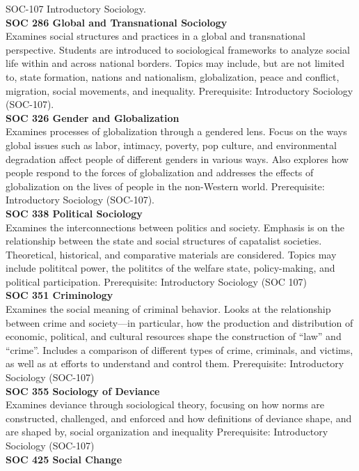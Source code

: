 \documentclass[
  letterpaper,
]{scrbook}
\begin{document}
SOC-107 Introductory Sociology.\\
\textbf{SOC 286 Global and Transnational Sociology}\\
Examines social structures and practices in a global and transnational
perspective. Students are introduced to sociological frameworks to
analyze social life within and across national borders. Topics may
include, but are not limited to, state formation, nations and
nationalism, globalization, peace and conflict, migration, social
movements, and inequality. Prerequisite: Introductory Sociology
(SOC-107).\\
\textbf{SOC 326 Gender and Globalization}\\
Examines processes of globalization through a gendered lens. Focus on
the ways global issues such as labor, intimacy, poverty, pop culture,
and environmental degradation affect people of different genders in
various ways. Also explores how people respond to the forces of
globalization and addresses the effects of globalization on the lives of
people in the non-Western world. Prerequisite: Introductory Sociology
(SOC-107).\\
\textbf{SOC 338 Political Sociology}\\
Examines the interconnections between politics and society. Emphasis is
on the relationship between the state and social structures of
capatalist societies. Theoretical, historical, and comparative materials
are considered. Topics may include polititcal power, the polititcs of
the welfare state, policy-making, and political participation.
Prerequisite: Introductory Sociology (SOC 107)\\
\textbf{SOC 351 Criminology}\\
Examines the social meaning of criminal behavior. Looks at the
relationship between crime and society---in particular, how the
production and distribution of economic, political, and cultural
resources shape the construction of ``law'' and ``crime''. Includes a
comparison of different types of crime, criminals, and victims, as well
as at efforts to understand and control them. Prerequisite: Introductory
Sociology (SOC-107)\\
\textbf{SOC 355 Sociology of Deviance}\\
Examines deviance through sociological theory, focusing on how norms are
constructed, challenged, and enforced and how definitions of deviance
shape, and are shaped by, social organization and inequality
Prerequisite: Introductory Sociology (SOC-107)\\
\textbf{SOC 425 Social Change}\\
\end{document}
